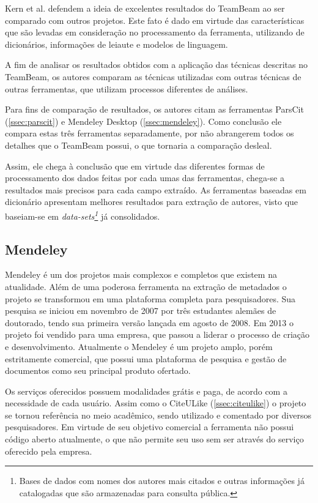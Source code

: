 Kern et al. defendem a ideia de excelentes resultados do TeamBeam ao ser comparado com outros projetos. Este fato é dado em virtude das características que são levadas em consideração no processamento da ferramenta, utilizando de dicionários, informações de leiaute e modelos de linguagem.

A fim de analisar os resultados obtidos com a aplicação das técnicas descritas no TeamBeam, os autores comparam as técnicas utilizadas com outras técnicas de outras ferramentas, que utilizam processos diferentes de análises.

Para fins de comparação de resultados, os autores citam as ferramentas ParsCit (\autoref{ssec:parscit}) e Mendeley Desktop (\autoref{ssec:mendeley}). Como conclusão ele compara estas três ferramentas separadamente, por não abrangerem todos os detalhes que o TeamBeam possui, o que tornaria a comparação desleal.

Assim, ele chega à conclusão que em virtude das diferentes formas de processamento dos dados feitas por cada umas das ferramentas, chega-se a resultados mais precisos para cada campo extraído. As ferramentas baseadas em dicionário apresentam melhores resultados para extração de autores, visto que baseiam-se em \textit{data-sets\footnote{Bases de dados com nomes dos autores mais citados e outras informações já catalogadas que são armazenadas para consulta pública.}} já consolidados.

\subsection{Mendeley}
\label{ssec:mendeley}

Mendeley é um dos projetos mais complexos e completos que existem na atualidade. Além de uma poderosa ferramenta na extração de metadados o projeto se transformou em uma plataforma completa para pesquisadores. Sua pesquisa se iniciou em novembro de 2007 por três estudantes alemães de doutorado, tendo sua primeira versão lançada em agosto de 2008. Em 2013 o projeto foi vendido para uma empresa, que passou a liderar o processo de criação e desenvolvimento. Atualmente o Mendeley é um projeto amplo, porém estritamente comercial, que possui uma plataforma de pesquisa e gestão de documentos como seu principal produto ofertado.

Os serviços oferecidos possuem modalidades grátis e paga, de acordo com a necessidade de cada usuário. Assim como o CiteULike (\autoref{ssec:citeulike}) o projeto se tornou referência no meio acadêmico, sendo utilizado e comentado por diversos pesquisadores. Em virtude de seu objetivo comercial a ferramenta não possui código aberto atualmente, o que não permite seu uso sem ser através do serviço oferecido pela empresa.

